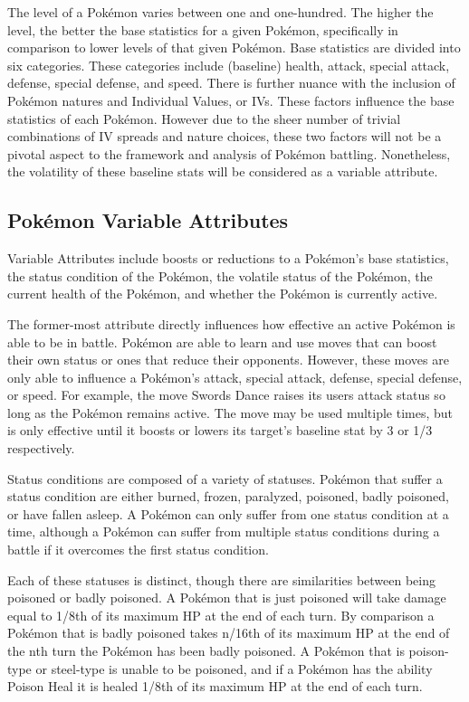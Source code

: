\documentclass[12pt,twoside]{reedthesis}
\begin{document}
  The level of a Pokémon varies between one and one-hundred. The higher
  the level, the better the base statistics for a given Pokémon,
  specifically in comparison to lower levels of that given Pokémon. Base
  statistics are divided into six categories. These categories include
  (baseline) health, attack, special attack, defense, special defense, and
  speed. There is further nuance with the inclusion of Pokémon natures and
  Individual Values, or IVs. These factors influence the base statistics
  of each Pokémon. However due to the sheer number of trivial combinations
  of IV spreads and nature choices, these two factors will not be a
  pivotal aspect to the framework and analysis of Pokémon battling.
  Nonetheless, the volatility of these baseline stats will be considered
  as a variable attribute.
  
  \subsection{Pokémon Variable
  Attributes}\label{pokemon-variable-attributes}
  
  Variable Attributes include boosts or reductions to a Pokémon's base
  statistics, the status condition of the Pokémon, the volatile status of
  the Pokémon, the current health of the Pokémon, and whether the Pokémon
  is currently active.
  
  The former-most attribute directly influences how effective an active
  Pokémon is able to be in battle. Pokémon are able to learn and use moves
  that can boost their own status or ones that reduce their opponents.
  However, these moves are only able to influence a Pokémon's attack,
  special attack, defense, special defense, or speed. For example, the
  move Swords Dance raises its users attack status so long as the Pokémon
  remains active. The move may be used multiple times, but is only
  effective until it boosts or lowers its target's baseline stat by 3 or
  1/3 respectively.
  
  Status conditions are composed of a variety of statuses. Pokémon that
  suffer a status condition are either burned, frozen, paralyzed,
  poisoned, badly poisoned, or have fallen asleep. A Pokémon can only
  suffer from one status condition at a time, although a Pokémon can
  suffer from multiple status conditions during a battle if it overcomes
  the first status condition.
  
  Each of these statuses is distinct, though there are similarities
  between being poisoned or badly poisoned. A Pokémon that is just
  poisoned will take damage equal to 1/8th of its maximum HP at the end of
  each turn. By comparison a Pokémon that is badly poisoned takes n/16th
  of its maximum HP at the end of the nth turn the Pokémon has been badly
  poisoned. A Pokémon that is poison-type or steel-type is unable to be
  poisoned, and if a Pokémon has the ability Poison Heal it is healed
  1/8th of its maximum HP at the end of each turn.
  
\end{document}
